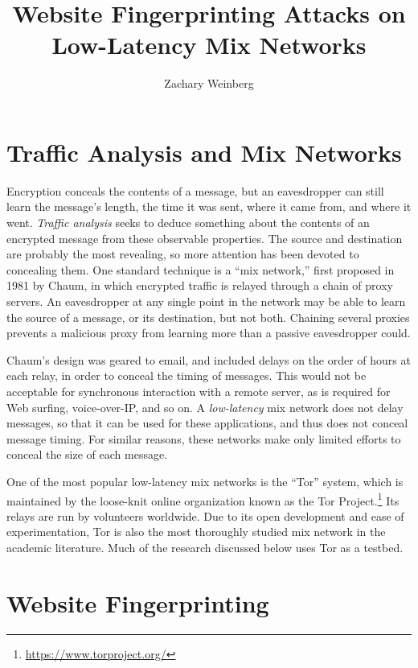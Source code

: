 \documentclass{cmuecequal}
\begin{document}
\title{Website Fingerprinting Attacks on Low-Latency Mix Networks}
\author{Zachary Weinberg}
\maketitle

\section{Traffic Analysis and Mix Networks}

Encryption conceals the contents of a message, but an eavesdropper can
still learn the message's length, the time it was sent, where it came
from, and where it went.  \emph{Traffic analysis} seeks to deduce
something about the contents of an encrypted message from these
observable properties.  The source and destination are probably the
most revealing, so more attention has been devoted to concealing them.
One standard technique is a “mix network,” first proposed in 1981 by
Chaum, in which encrypted traffic is relayed through a chain of proxy
servers.  An eavesdropper at any single point in the network may be
able to learn the source of a message, or its destination, but not
both.  Chaining several proxies prevents a malicious proxy from
learning more than a passive eavesdropper could.

Chaum's design was geared to email, and included delays on the order
of hours at each relay, in order to conceal the timing of messages.
This would not be acceptable for synchronous interaction with a remote
server, as is required for Web surfing, voice-over-IP, and so on.  A
\emph{low-latency} mix network does not delay messages, so that it can
be used for these applications, and thus does not conceal message
timing.  For similar reasons, these networks make only limited efforts
to conceal the size of each message.

One of the most popular low-latency mix networks is the “Tor” system,
which is maintained by the loose-knit online organization known as the
Tor Project.\footnote{\url{https://www.torproject.org/}} Its relays
are run by volunteers worldwide.  Due to its open development and ease
of experimentation, Tor is also the most thoroughly studied mix
network in the academic literature.  Much of the research discussed
below uses Tor as a testbed.

\section{Website Fingerprinting}
\end{document}
